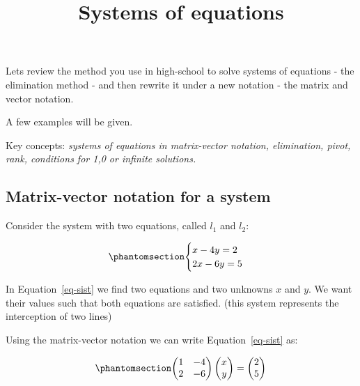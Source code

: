 \documentclass[
  letterpaper,
  DIV=11,
  numbers=noendperiod]{scrartcl}
\title{Systems of equations}
\author{}
\date{}
\renewcommand*\contentsname{Table of contents}
\newcommand\contentsname{Table of contents}
\theoremstyle{definition}
\theoremstyle{remark}
\begin{document}
\maketitle

\renewcommand*\contentsname{Table of contents}
{
\hypersetup{linkcolor=}
\setcounter{tocdepth}{3}
\tableofcontents
}

Lets review the method you use in high-school to solve systems of
equations - the elimination method - and then rewrite it under a new
notation - the matrix and vector notation.

A few examples will be given.

Key concepts: \emph{systems of equations in matrix-vector notation,
elimination, pivot, rank, conditions for 1,0 or infinite solutions.}

\subsection{Matrix-vector notation for a
system}\label{matrix-vector-notation-for-a-system}

Consider the system with two equations, called \(l_1\) and \(l_2\):

\begin{equation}\phantomsection\label{eq-sist}{
\begin{cases}
x-4y =2\\
2x-6y = 5
\end{cases}
}\end{equation}

In Equation~\ref{eq-sist} we find two equations and two unknowns \(x\)
and \(y\). We want their values such that both equations are satisfied.
(this system represents the interception of two lines)

Using the matrix-vector notation we can write Equation~\ref{eq-sist} as:

\begin{equation}\phantomsection\label{eq-matrix_sist}{
\begin{pmatrix} 1 & -4\\ 2 & -6 \end{pmatrix}\begin{pmatrix}x\\y\end{pmatrix}= \begin{pmatrix}2\\5\end{pmatrix}
}\end{equation}
\end{document}
